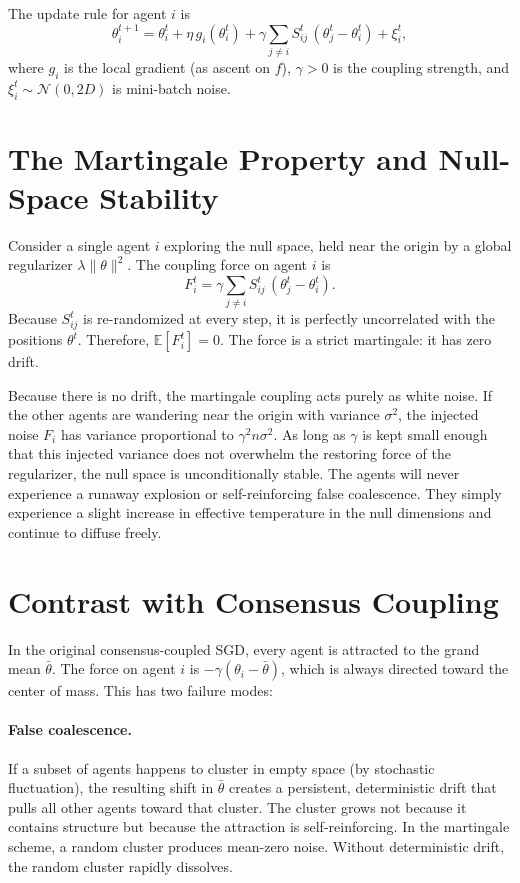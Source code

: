 \documentclass{article}
\begin{document}
The update rule for agent $i$ is
\begin{equation}\label{eq:martingale-update}
\theta_i^{t+1}
= \theta_i^t + \eta\,g_i(\theta_i^t)
+ \gamma \sum_{j \neq i} S_{ij}^t\,(\theta_j^t - \theta_i^t)
+ \xi_i^t,
\end{equation}
where $g_i$ is the local gradient (as ascent on $f$), $\gamma > 0$ is the
coupling strength, and $\xi_i^t \sim \mathcal{N}(0, 2D)$ is mini-batch noise.

\section{The Martingale Property and Null-Space Stability}

Consider a single agent $i$ exploring the null space, held near the origin by a global regularizer $\lambda \|\theta\|^2$. The coupling force on agent $i$ is
\[
F_i^t = \gamma \sum_{j \neq i} S_{ij}^t\,(\theta_j^t - \theta_i^t).
\]
Because $S_{ij}^t$ is re-randomized at every step, it is perfectly uncorrelated with the positions $\theta^t$. Therefore, $\mathbb{E}[F_i^t] = 0$. The force
is a strict martingale: it has zero drift. 

Because there is no drift, the martingale coupling acts purely as white noise. If the other agents are wandering near the origin with variance $\sigma^2$, the injected noise $F_i$ has variance proportional to $\gamma^2 n \sigma^2$. As long as $\gamma$ is kept small enough that this injected variance does not overwhelm the restoring force of the regularizer, the null space is unconditionally stable. The agents will never experience a runaway explosion or self-reinforcing false coalescence. They simply experience a slight increase in effective temperature in the null dimensions and continue to diffuse freely.

\section{Contrast with Consensus Coupling}

In the original consensus-coupled SGD, every agent is attracted to the
grand mean $\bar{\theta}$. The force on agent $i$ is
$-\gamma(\theta_i - \bar{\theta})$, which is always directed toward the
center of mass. This has two failure modes:

\paragraph{False coalescence.}
If a subset of agents happens to cluster in empty space (by stochastic
fluctuation), the resulting shift in $\bar{\theta}$ creates a persistent, deterministic drift that pulls all other
agents toward that cluster. The cluster grows not because it contains
structure but because the attraction is self-reinforcing. In the
martingale scheme, a random cluster produces mean-zero noise. Without deterministic drift, the random cluster rapidly dissolves.
\end{document}

